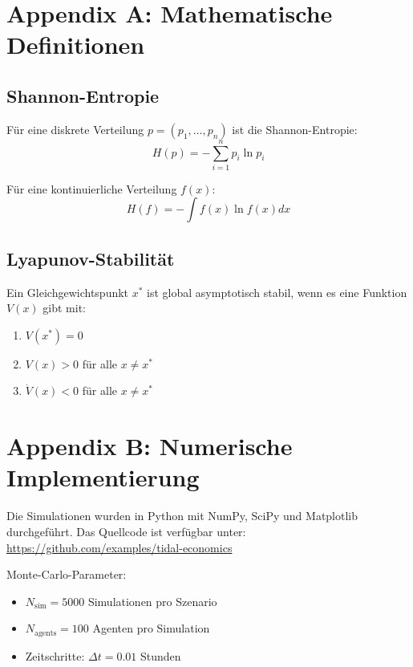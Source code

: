 \documentclass[a4paper,12pt]{article}
\theoremstyle{definition}
\begin{document}
\section{Appendix A: Mathematische Definitionen}

\subsection{Shannon-Entropie}

Für eine diskrete Verteilung $p = (p_1, \ldots, p_n)$ ist die Shannon-Entropie:
\begin{equation}
    H(p) = -\sum_{i=1}^n p_i \ln p_i
\end{equation}

Für eine kontinuierliche Verteilung $f(x)$:
\begin{equation}
    H(f) = -\int f(x) \ln f(x) dx
\end{equation}

\subsection{Lyapunov-Stabilität}

Ein Gleichgewichtspunkt $x^*$ ist global asymptotisch stabil, wenn es eine Funktion $V(x)$ gibt mit:
\begin{enumerate}
    \item $V(x^*) = 0$
    \item $V(x) > 0$ für alle $x \neq x^*$
    \item $\dot{V}(x) < 0$ für alle $x \neq x^*$
\end{enumerate}

\section{Appendix B: Numerische Implementierung}

Die Simulationen wurden in Python mit NumPy, SciPy und Matplotlib durchgeführt. Das Quellcode ist verfügbar unter:
\url{https://github.com/examples/tidal-economics}

Monte-Carlo-Parameter:
\begin{itemize}
    \item $N_{\text{sim}} = 5000$ Simulationen pro Szenario
    \item $N_{\text{agents}} = 100$ Agenten pro Simulation
    \item Zeitschritte: $\Delta t = 0.01$ Stunden
\end{itemize}
\end{document}
